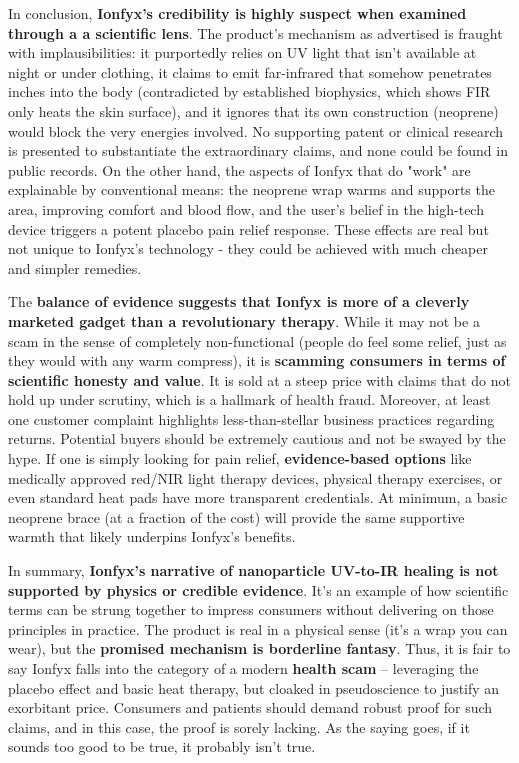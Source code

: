 \documentclass{article}
\begin{document}
In conclusion, \textbf{Ionfyx's credibility is highly suspect when examined through a a scientific lens}. The product's mechanism as advertised is fraught with implausibilities: it purportedly relies on UV light that isn't available at night or under clothing, it claims to emit far-infrared that somehow penetrates inches into the body (contradicted by established biophysics, which shows FIR only heats the skin surface), and it ignores that its own construction (neoprene) would block the very energies involved. No supporting patent or clinical research is presented to substantiate the extraordinary claims, and none could be found in public records. On the other hand, the aspects of Ionfyx that do "work" are explainable by conventional means: the neoprene wrap warms and supports the area, improving comfort and blood flow, and the user's belief in the high-tech device triggers a potent placebo pain relief response. These effects are real but not unique to Ionfyx's technology - they could be achieved with much cheaper and simpler remedies.

The \textbf{balance of evidence suggests that Ionfyx is more of a cleverly marketed gadget than a revolutionary therapy}. While it may not be a scam in the sense of completely non-functional (people do feel some relief, just as they would with any warm compress), it is \textbf{scamming consumers in terms of scientific honesty and value}. It is sold at a steep price with claims that do not hold up under scrutiny, which is a hallmark of health fraud. Moreover, at least one customer complaint highlights less-than-stellar business practices regarding returns. Potential buyers should be extremely cautious and not be swayed by the hype. If one is simply looking for pain relief, \textbf{evidence-based options} like medically approved red/NIR light therapy devices, physical therapy exercises, or even standard heat pads have more transparent credentials. At minimum, a basic neoprene brace (at a fraction of the cost) will provide the same supportive warmth that likely underpins Ionfyx's benefits.

In summary, \textbf{Ionfyx's narrative of nanoparticle UV-to-IR healing is not supported by physics or credible evidence}. It's an example of how scientific terms can be strung together to impress consumers without delivering on those principles in practice. The product is real in a physical sense (it's a wrap you can wear), but the \textbf{promised mechanism is borderline fantasy}. Thus, it is fair to say Ionfyx falls into the category of a modern \textbf{health scam} – leveraging the placebo effect and basic heat therapy, but cloaked in pseudoscience to justify an exorbitant price. Consumers and patients should demand robust proof for such claims, and in this case, the proof is sorely lacking. As the saying goes, if it sounds too good to be true, it probably isn't true.
\end{document}

